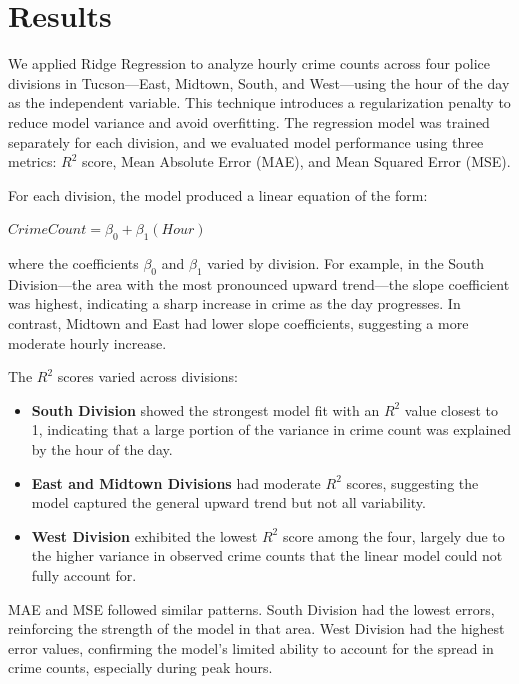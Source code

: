 \documentclass{report}
\begin{document}
    \section*{Results}
    
    We applied Ridge Regression to analyze hourly crime counts across four police divisions in Tucson—East, Midtown, South, and West—using the hour of the day as the independent variable. This technique introduces a regularization penalty to reduce model variance and avoid overfitting. The regression model was trained separately for each division, and we evaluated model performance using three metrics: $R^2$ score, Mean Absolute Error (MAE), and Mean Squared Error (MSE).
    
    For each division, the model produced a linear equation of the form:
    
    \begin{math}
    	{CrimeCount} = \beta_0 + \beta_1({Hour})
    \end{math}
    
    where the coefficients $\beta_0$ and $\beta_1$ varied by division. For example, in the South Division—the area with the most pronounced upward trend—the slope coefficient was highest, indicating a sharp increase in crime as the day progresses. In contrast, Midtown and East had lower slope coefficients, suggesting a more moderate hourly increase.
    
    The $R^2$ scores varied across divisions:
    \begin{itemize}
    	\item \textbf{South Division} showed the strongest model fit with an $R^2$ value closest to 1, indicating that a large portion of the variance in crime count was explained by the hour of the day.
    	\item \textbf{East and Midtown Divisions} had moderate $R^2$ scores, suggesting the model captured the general upward trend but not all variability.
    	\item \textbf{West Division} exhibited the lowest $R^2$ score among the four, largely due to the higher variance in observed crime counts that the linear model could not fully account for.
    \end{itemize}
    
    MAE and MSE followed similar patterns. South Division had the lowest errors, reinforcing the strength of the model in that area. West Division had the highest error values, confirming the model's limited ability to account for the spread in crime counts, especially during peak hours.
    
\end{document}

